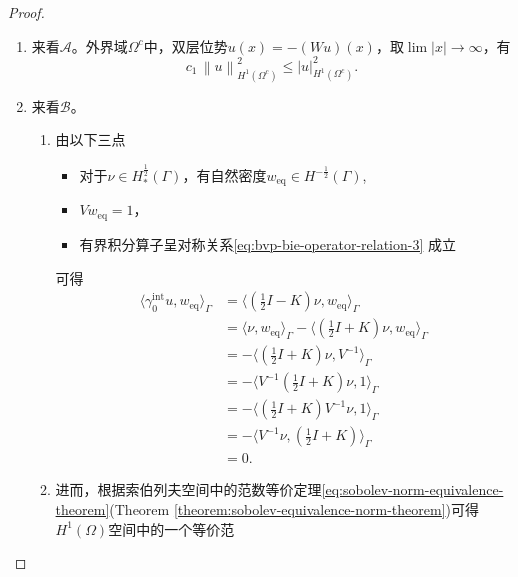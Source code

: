 \begin{proof}
\begin{enumerate}
\begin{enumerate}
  \item 来看$\mathcal{A}$。外界域$\Omega^{c}$中，双层位势$u(x) = - \left(W u \right)(x)$，取$\lim \left| x \right| \rightarrow \infty$，有
  \begin{equation*}
    c_{1}  \, \left\| u \right\|_{H^{1}(\Omega^{c})}^{2} \le
    \left| u \right|_{H^{1}(\Omega^{c})}^{2}.
  \end{equation*}
  \item 来看$\mathcal{B}$。
  \begin{enumerate}
    \item 由以下三点
    \begin{itemize}
    \item 对于$\nu \in H_{*}^{\frac{1}{2}}(\Gamma)$，有自然密度$w_{\text{eq}} \in H^{-\frac{1}{2}}(\Gamma)$,
    \item $V w_{\text{eq}} = 1$，
    \item 有界积分算子呈对称关系\eqref{eq:bvp-bie-operator-relation-3} 成立
    \end{itemize}
    可得
    \begin{equation*}
      \begin{split}
        \langle \gamma_{0}^{\text{int}} u, w_{\text{eq}} \rangle_{\Gamma} & =
        \langle
        \left( \frac{1}{2} I - K \right) \nu,
        w_{\text{eq}}
        \rangle_{\Gamma} \\
        & = \langle \nu, w_{\text{eq}} \rangle_{\Gamma}
        - \langle
        \left( \frac{1}{2} I + K \right) \nu,
        w_{\text{eq}} \rangle_{\Gamma} \\
        & = - \langle
        \left( \frac{1}{2} I + K \right) \nu,
        V^{-1} \rangle_{\Gamma} \\
        & = - \langle
        V ^{-1} \left( \frac{1}{2} I + K \right) \nu,
        1 \rangle_{\Gamma} \\
        & = - \langle
        \left( \frac{1}{2} I + K \right) V^{-1}  \nu,
        1 \rangle_{\Gamma} \\
        & = - \langle
        V^{-1}  \nu,
        \left( \frac{1}{2} I + K \right)  \rangle_{\Gamma} \\
        & = 0.
      \end{split}
    \end{equation*}
    \item 进而，根据索伯列夫空间中的范数等价定理\eqref{eq:sobolev-norm-equivalence-theorem}(Theorem \ref{theorem:sobolev-equivalence-norm-theorem})可得$H^{1}(\Omega)$空间中的一个等价范

\end{enumerate}
\end{enumerate}
\end{enumerate}
\end{proof}
